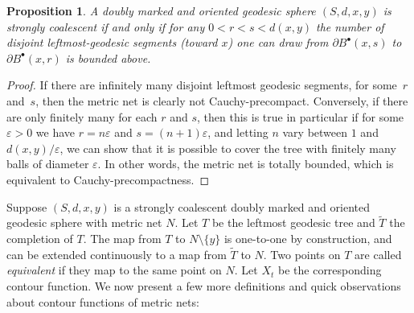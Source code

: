 \documentclass[10pt]{amsart}
\newcommand{\sbullet}{{\scriptscriptstyle\bullet}}
\let\epsilon\varepsilon
\theoremstyle{plain}
\numberwithin{theorem}{section}
\newtheorem{proposition}[theorem]{Proposition}
\theoremstyle{definition}
\let\wt\widetilde
\newcommand{\fb}[2]{B^\sbullet(#1,#2)}
\begin{document}
\begin{proposition}
\label{prop::coalescentprecompact}
A doubly marked and oriented geodesic sphere $(S,d,x,y)$ is strongly coalescent if and only if for any $0<r<s <d(x,y)$ the number of disjoint leftmost-geodesic segments (toward $x$) one can draw from $\partial \fb{x}{s}$ to $\partial \fb{x}{r}$ is bounded above.
\end{proposition}
\begin{proof}
If there are infinitely many disjoint leftmost geodesic segments, for some~$r$ and~$s$, then the metric net is clearly not Cauchy-precompact. Conversely, if there are only finitely many for each $r$ and $s$, then this is true in particular if for some $\epsilon>0$ we have $r = n \epsilon$ and $s=(n+1)\epsilon$, and letting $n$ vary between $1$ and $d(x,y)/\epsilon$, we can show that it is possible to cover the tree with finitely many balls of diameter $\epsilon$. In other words, the metric net is totally bounded, which is equivalent to Cauchy-precompactness.
\end{proof}

Suppose $(S,d,x,y)$ is a strongly coalescent doubly marked and oriented geodesic sphere with metric net $N$. Let $T$ be the leftmost geodesic tree and $\wt T$ the completion of $T$. The map from $T$ to $N \setminus \{y\}$ is one-to-one by construction, and can be extended continuously to a map from $\wt T$ to $N$. Two points on $T$ are called \emph{equivalent} if they map to the same point on $N$. Let $X_t$ be the corresponding contour function. We now present a few more definitions and quick observations about contour functions of metric nets:
\end{document}
